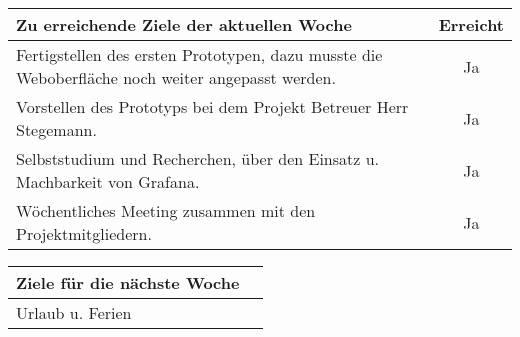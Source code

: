 \begin{tabularx}{\textwidth}{Xc}
    \arrayrulecolor{OliveGreen}
    \toprule
    {\bfseries Zu erreichende Ziele der aktuellen Woche} & {\bfseries Erreicht} \\
    \midrule[2pt]
    Fertigstellen des ersten Prototypen, dazu musste die Weboberfläche noch
    weiter angepasst werden.               &Ja                 \\
    \rowcolor{OliveGreen!15}
    Vorstellen des Prototyps bei dem Projekt Betreuer Herr Stegemann.  &Ja    \\
    \rowcolor{White}
    Selbststudium und Recherchen, über den Einsatz u. Machbarkeit von
    Grafana.  &Ja                 \\
    \rowcolor{OliveGreen!15}
    Wöchentliches Meeting zusammen mit den Projektmitgliedern.  &Ja           \\
   \bottomrule[2pt]
\end{tabularx}
%
\vspace{1cm}
%
\begin{tabularx}{\textwidth}{Xc}
    \arrayrulecolor{OliveGreen}
    \toprule
    {\bfseries Ziele für die nächste Woche}              &                   \\
    \midrule[2pt]
    Urlaub u. Ferien                                     &                   \\
\end{tabularx}
